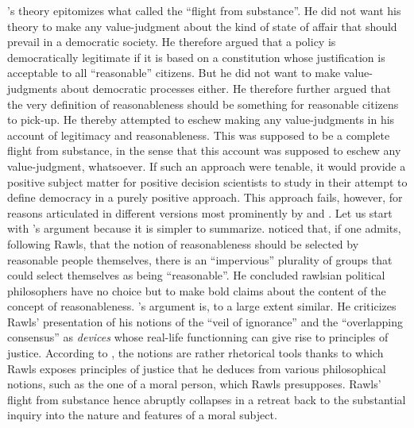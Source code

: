 \documentclass[preprint,11pt]{elsarticle}
\begin{document}
\cite{rawls_political_2005}'s theory epitomizes what \cite{estlund_democratic_2009} called the ``flight from substance''. He did not want his theory to make any value-judgment about the kind of state of affair that should prevail in a democratic society. He therefore argued that a policy is democratically legitimate if it is based on a constitution whose justification is acceptable to all ``reasonable'' citizens. But he did not want to make value-judgments about democratic processes either. He therefore further argued that the very definition of reasonableness should be something for reasonable citizens to pick-up. He thereby attempted to eschew making any value-judgments in his account of legitimacy and reasonableness. This was supposed to be a complete flight from substance, in the sense that this account was supposed to eschew any value-judgment, whatsoever. If such an approach were tenable, it would provide a positive subject matter for positive decision scientists to study in their attempt to define democracy in a purely positive approach. This approach fails, however, for reasons articulated in different versions most prominently by \cite{habermas_reconciliation_1995} and \cite{estlund_democratic_2009}. Let us start with \cite{estlund_democratic_2009}'s argument because it is simpler to summarize. \cite{estlund_democratic_2009} noticed that, if one admits, following Rawls, that the notion of reasonableness should be selected by reasonable people themselves, there is an ``impervious'' plurality of groups that could select themselves as being ``reasonable''. He concluded rawlsian political philosophers have no choice but to make bold claims about the content of the concept of reasonableness. \cite{habermas_reconciliation_1995}'s argument is, to a large extent similar. He criticizes Rawls' presentation of his notions of the ``veil of ignorance'' and the ``overlapping consensus'' as \emph{devices} whose real-life functionning can give rise to principles of justice. According to \cite{habermas_reconciliation_1995}, the notions are rather rhetorical tools thanks to which Rawls exposes principles of justice that he deduces from various philosophical notions, such as the one of a moral person, which Rawls presupposes. Rawls' flight from substance hence abruptly collapses in a retreat back to the substantial inquiry into the nature and features of a moral subject.
\end{document}
